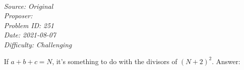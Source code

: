 \SSbreak\\
\emph{Source: Original}\\
\emph{Proposer: \Pnjoy}\\
\emph{Problem ID: 251}\\
\emph{Date: 2021-08-07}\\
\emph{Difficulty: Challenging}\\
\SSbreak

\bigskip

\begin{solution}\hfil\medskip
  
    If $a + b + c = N$, it's something to do with the divisors of $(N + 2)^2$. Answer: \fbox{}
\end{solution}\bigskip
